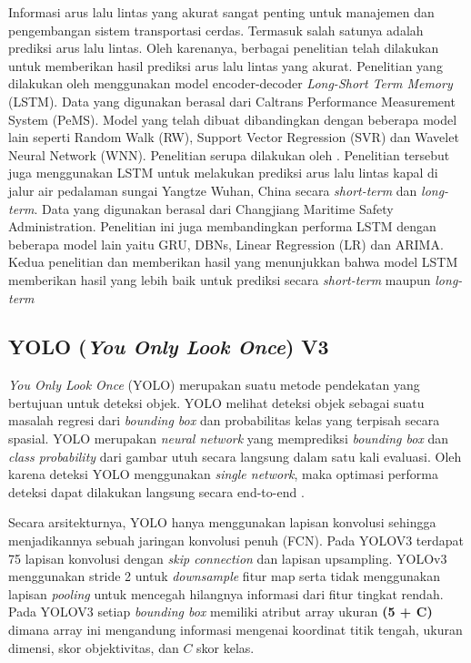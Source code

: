 \documentclass[conference]{IEEEtran}
\begin{document}
Informasi arus lalu lintas yang akurat sangat penting untuk manajemen dan pengembangan sistem transportasi cerdas. Termasuk salah satunya adalah prediksi arus lalu lintas. Oleh karenanya, berbagai penelitian telah dilakukan untuk memberikan hasil prediksi arus lalu lintas yang akurat.
Penelitian yang dilakukan oleh \cite{LSTM_2} menggunakan model encoder-decoder \textit{Long-Short Term Memory} (LSTM). Data yang digunakan berasal dari Caltrans Performance Measurement System (PeMS). Model yang telah dibuat dibandingkan dengan beberapa model lain seperti Random Walk (RW), Support Vector Regression (SVR) dan Wavelet Neural Network (WNN). 
Penelitian serupa dilakukan oleh \cite{LSTM_1}. Penelitian tersebut juga menggunakan LSTM untuk melakukan prediksi arus lalu lintas kapal di jalur air pedalaman sungai Yangtze Wuhan, China secara \textit{short-term} dan \textit{long-term}. Data yang digunakan berasal dari Changjiang Maritime Safety Administration. Penelitian ini juga membandingkan performa LSTM dengan beberapa model lain yaitu GRU, DBNs, Linear Regression (LR) dan ARIMA.
Kedua penelitian \cite{LSTM_1} dan \cite{LSTM_2} memberikan hasil yang menunjukkan bahwa model LSTM memberikan hasil yang lebih baik untuk prediksi secara \textit{short-term} maupun \textit{long-term}

\subsection{YOLO (\textit{You Only Look Once}) V3}

\textit{You Only Look Once} (YOLO) merupakan suatu metode pendekatan yang bertujuan untuk deteksi objek. YOLO melihat deteksi objek sebagai suatu masalah regresi dari \textit{bounding box} dan
probabilitas kelas yang terpisah secara spasial. YOLO merupakan \textit{neural network} yang memprediksi \textit{bounding box} dan \textit{class probability} dari gambar utuh secara langsung dalam satu kali
evaluasi. Oleh karena deteksi YOLO menggunakan \textit{single network}, maka optimasi performa deteksi dapat dilakukan langsung secara end-to-end \cite{YoloV1}.

Secara arsitekturnya, YOLO hanya menggunakan lapisan konvolusi sehingga menjadikannya sebuah jaringan konvolusi penuh (FCN). Pada YOLOV3 terdapat 75 lapisan konvolusi dengan \textit{skip connection} dan lapisan upsampling.
YOLOv3 menggunakan stride 2 untuk \textit{downsample} fitur map serta tidak menggunakan lapisan \textit{pooling} untuk mencegah hilangnya informasi dari fitur tingkat rendah. Pada YOLOV3 setiap \textit{bounding box} memiliki atribut array ukuran \textbf{(5 + C)} dimana array ini mengandung informasi
mengenai koordinat titik tengah, ukuran dimensi, skor objektivitas, dan $C$ skor kelas.
\end{document}
